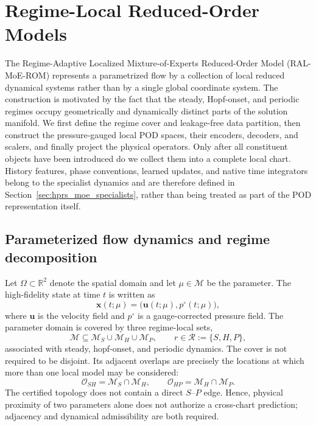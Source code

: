 

\section{Regime-Local Reduced-Order Models}
\label{sec:regime_local_representation}

The Regime-Adaptive Localized Mixture-of-Experts Reduced-Order Model
(RAL-MoE-ROM) represents a parametrized flow by a collection of local
reduced dynamical systems rather than by a single global coordinate system.
The construction is motivated by the fact that the steady, Hopf-onset, and
periodic regimes occupy geometrically and dynamically distinct parts of the
solution manifold.  We first define the regime cover and leakage-free data
partition, then construct the pressure-gauged local POD spaces, their
encoders, decoders, and scalers, and finally project the physical operators.
Only after all constituent objects have been introduced do we collect them
into a complete local chart.  History features, phase conventions, learned
updates, and native time integrators belong to the specialist dynamics and
are therefore defined in Section~\ref{sec:hprs_moe_specialists}, rather than
being treated as part of the POD representation itself.


\subsection{Parameterized flow dynamics and regime decomposition}
\label{subsec:parametric_regime_decomposition}

Let $\Omega\subset\mathbb{R}^{2}$ denote the spatial domain and let
$\mu\in\mathcal{M}$ be the parameter.  The
high-fidelity state at time $t$ is written as
\begin{equation}
  \boldsymbol{x}(t;\mu)
  =
  \bigl(\boldsymbol{u}(t;\mu),p^{\circ}(t;\mu)\bigr),
  \label{eq:full_state_definition}
\end{equation}
where $\boldsymbol{u}$ is the velocity field and $p^{\circ}$ is a
gauge-corrected pressure field.  The parameter domain is covered by three
regime-local sets,
\begin{equation}
  \mathcal{M}
  \subseteq
  \mathcal{M}_{S}\cup\mathcal{M}_{H}\cup\mathcal{M}_{P},
  \qquad
  r\in\mathcal{R}:=\{S,H,P\},
  \label{eq:regime_cover}
\end{equation}
associated with steady, hopf-onset, and periodic dynamics.  The cover is not
required to be disjoint.  Its adjacent overlaps are precisely the locations
at which more than one local model may be considered:
\begin{equation}
  \mathcal{O}_{SH}=\mathcal{M}_{S}\cap\mathcal{M}_{H},
  \qquad
  \mathcal{O}_{HP}=\mathcal{M}_{H}\cap\mathcal{M}_{P}.
  \label{eq:adjacent_overlaps}
\end{equation}
The certified topology does not contain a direct $S$--$P$ edge.  Hence,
physical proximity of two parameters alone does not authorize a cross-chart
prediction; adjacency and dynamical admissibility are both required.


